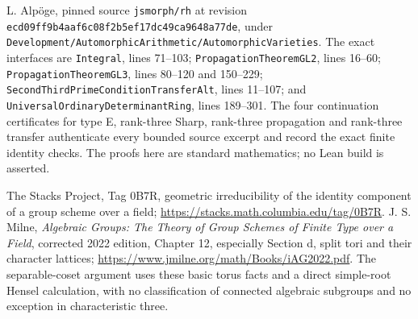 L. Alp\"oge, pinned source \texttt{jsmorph/rh} at revision
\texttt{ecd09ff9b4aaf6c08f2b5ef17dc49ca9648a77de}, under
\texttt{Development/AutomorphicArithmetic/AutomorphicVarieties}.
The exact interfaces are \texttt{Integral}, lines 71--103;
\texttt{PropagationTheoremGL2}, lines 16--60;
\texttt{PropagationTheoremGL3}, lines 80--120 and 150--229;
\texttt{SecondThirdPrimeConditionTransferAlt}, lines 11--107;
and \texttt{UniversalOrdinaryDeterminantRing}, lines 189--301.
The four continuation certificates for type E, rank-three Sharp,
rank-three propagation and rank-three transfer authenticate every
bounded source excerpt and record the exact finite identity checks.
The proofs here are standard mathematics; no Lean build is asserted.

The Stacks Project, Tag 0B7R, geometric irreducibility of the
identity component of a group scheme over a field;
\url{https://stacks.math.columbia.edu/tag/0B7R}.
J. S. Milne, \emph{Algebraic Groups: The Theory of Group Schemes
of Finite Type over a Field}, corrected 2022 edition, Chapter 12,
especially Section d, split tori and their character lattices;
\url{https://www.jmilne.org/math/Books/iAG2022.pdf}.
The separable-coset argument uses these basic torus facts and a
direct simple-root Hensel calculation, with no classification of
connected algebraic subgroups and no exception in characteristic three.
